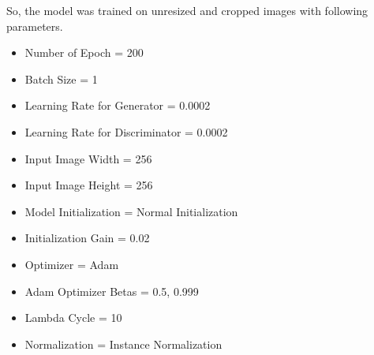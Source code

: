 So, the model was trained on unresized and cropped images with following parameters.
\begin{itemize}
    \item Number of Epoch = 200
    \item Batch Size = 1
    \item Learning Rate for Generator = 0.0002
    \item Learning Rate for Discriminator = 0.0002
    \item Input Image Width = 256
    \item Input Image Height = 256
    \item Model Initialization = Normal Initialization
    \item Initialization Gain = 0.02
    \item Optimizer = Adam
    \item Adam Optimizer Betas = 0.5, 0.999
    \item Lambda Cycle = 10
    \item Normalization = Instance Normalization
\end{itemize}
\newpage
